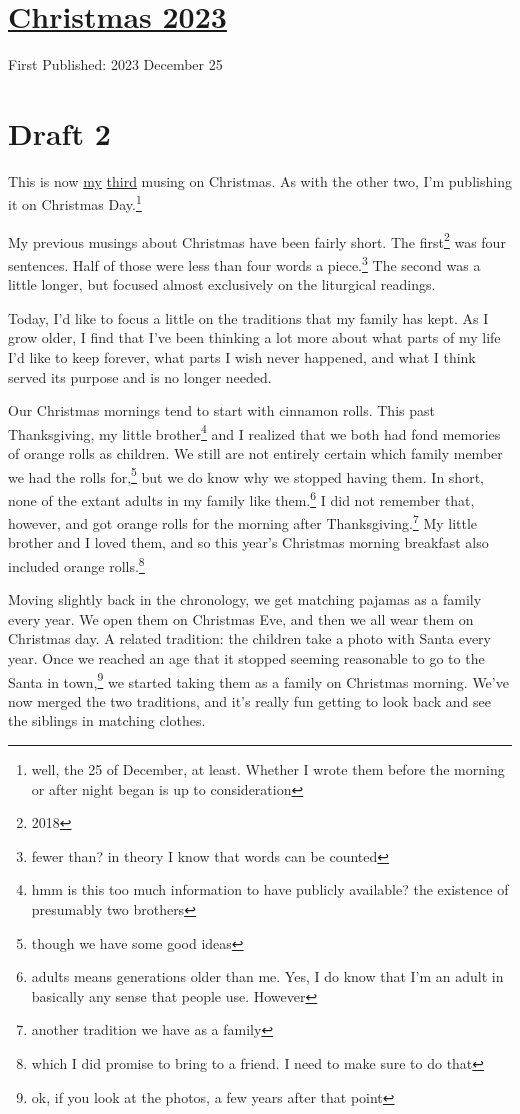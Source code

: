 \documentclass[12pt]{article}[titlepage]
\newcommand{\1}{\={a}}
\newcommand{\2}{\={e}}
\newcommand{\3}{\={\i}}
\newcommand{\4}{\=o}
\newcommand{\5}{\=u}
\newcommand{\6}{\={A}}
\renewcommand{\,}{\textsuperscript{,}}
\begin{document}
\doublespacing
\section{\href{christmas-2023.html}{Christmas 2023}}
First Published: 2023 December 25
\section{Draft 2}
This is now \href{christmas-2018.html}{my} \href{christmas-2022.html}{third} musing on Christmas.
As with the other two, I'm publishing it on Christmas Day.\footnote{well, the 25 of December, at least. Whether I wrote them before the morning or after night began is up to consideration}

My previous musings about Christmas have been fairly short.
The first\footnote{2018} was four sentences.
Half of those were less than four words a piece.\footnote{fewer than? in theory I know that words can be counted}
The second was a little longer, but focused almost exclusively on the liturgical readings.

Today, I'd like to focus a little on the traditions that my family has kept.
As I grow older, I find that I've been thinking a lot more about what parts of my life I'd like to keep forever, what parts I wish never happened, and what I think served its purpose and is no longer needed.

Our Christmas mornings tend to start with cinnamon rolls.
This past Thanksgiving, my little brother\footnote{hmm is this too much information to have publicly available? the existence of presumably two brothers} and I realized that we both had fond memories of orange rolls as children.
We still are not entirely certain which family member we had the rolls for,\footnote{though we have some good ideas} but we do know why we stopped having them.
In short, none of the extant adults in my family like them.\footnote{adults means generations older than me. Yes, I do know that I'm an adult in basically any sense that people use. However}
I did not remember that, however, and got orange rolls for the morning after Thanksgiving.\footnote{another tradition we have as a family}
My little brother and I loved them, and so this year's Christmas morning breakfast also included orange rolls.\footnote{which I did promise to bring to a friend. I need to make sure to do that}

Moving slightly back in the chronology, we get matching pajamas as a family every year. 
We open them on Christmas Eve, and then we all wear them on Christmas day.
A related tradition: the children take a photo with Santa every year.
Once we reached an age that it stopped seeming reasonable to go to the Santa in town,\footnote{ok, if you look at the photos, a few years after that point} we started taking them as a family on Christmas morning.
We've now merged the two traditions, and it's really fun getting to look back and see the siblings in matching clothes.
\end{document}
